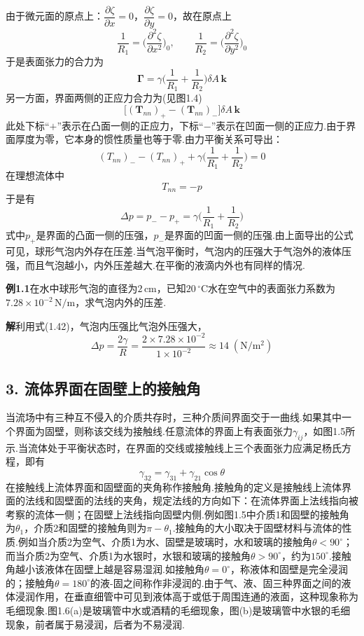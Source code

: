 由于微元面的原点上：$\dfrac{\partial\zeta}{\partial x}=0$，$\dfrac{\partial\zeta}{\partial y}=0$，故在原点上
\[
\frac{1}{R_1}=\Big(\frac{\partial^{2}\zeta}{\partial x^{2}}\Big)_{\!0},\qquad
\frac{1}{R_2}=\Big(\frac{\partial^{2}\zeta}{\partial y^{2}}\Big)_{\!0}
\]
于是表面张力的合力为
\begin{equation*}
\boldsymbol{\Gamma}=\gamma\Big(\frac{1}{R_1}+\frac{1}{R_2}\Big)\delta A\,\boldsymbol{k}
\tag{1.40}
\end{equation*}
另一方面，界面两侧的正应力合力为(见图1.4)
\[
\big[(\boldsymbol{T}_{nn})_{+}-(\boldsymbol{T}_{nn})_{-}\big]\delta A\,\boldsymbol{k}
\]
此处下标“$+$”表示在凸面一侧的正应力，下标“$-$”表示在凹面一侧的正应力.由于界面厚度为零，它本身的惯性质量也等于零.由力平衡关系可导出：
\begin{equation*}
(T_{nn})_{-}-(T_{nn})_{+}+\gamma\Big(\frac{1}{R_1}+\frac{1}{R_2}\Big)=0
\tag{1.41}
\end{equation*}
在理想流体中
\[
T_{nn}=-p
\]
于是有
\begin{equation*}
\Delta p=p_{-}-p_{+}=\gamma\Big(\frac{1}{R_1}+\frac{1}{R_2}\Big)
\tag{1.42}
\end{equation*}
式中$p_+$是界面的凸面一侧的压强，$p_-$是界面的凹面一侧的压强.由上面导出的公式可见，球形气泡内外存在压差.当气泡平衡时，气泡内的压强大于气泡外的液体压强，而且气泡越小，内外压差越大.在平衡的液滴内外也有同样的情况.

\noindent\textbf{例1.1}\quad 在水中球形气泡的直径为$2\,$cm，已知$20\,^\circ$C水在空气中的表面张力系数为$7.28\times 10^{-2}\,\mathrm{N/m}$，求气泡内外的压差.

\noindent\textbf{解}\quad 利用式(1.42)，气泡内压强比气泡外压强大，
\[
\Delta p=\frac{2\gamma}{R}=\frac{2\times 7.28\times 10^{-2}}{1\times 10^{-2}}\approx 14\;(\mathrm{N/m^{2}})
\]

\subsection*{3. 流体界面在固壁上的接触角}

当流场中有三种互不侵入的介质共存时，三种介质间界面交于一曲线.如果其中一个界面为固壁，则称该交线为接触线.任意流体的界面上有表面张力$\gamma_{ij}$，如图1.5所示.当流体处于平衡状态时，在界面的交线或接触线上三个表面张力应满足杨氏方程，即有
\begin{equation*}
\gamma_{32}=\gamma_{31}+\gamma_{21}\cos\theta
\tag{1.43}
\end{equation*}
在接触线上流体界面和固壁面的夹角称作接触角.接触角的定义是接触线上流体界面的法线和固壁面的法线的夹角，规定法线的方向如下：在流体界面上法线指向被考察的流体一侧；在固壁上法线指向固壁内侧.例如图1.5中介质1和固壁的接触角为$\theta_1$，介质2和固壁的接触角则为$\pi-\theta_1$.接触角的大小取决于固壁材料与流体的性质.例如当介质2为空气、介质1为水、固壁是玻璃时，水和玻璃的接触角$\theta<90^\circ$；而当介质2为空气、介质1为水银时，水银和玻璃的接触角$\theta>90^\circ$，约为$150^\circ$.接触角越小该液体在固壁上越是容易湿润.如接触角$\theta=0^\circ$，称液体和固壁是完全浸润的；接触角$\theta=180^\circ$的液-固之间称作非浸润的.由于气、液、固三种界面之间的液体浸润作用，在垂直细管中可见到液体高于或低于周围连通的液面，这种现象称为毛细现象.图1.6(a)是玻璃管中水或酒精的毛细现象，图(b)是玻璃管中水银的毛细现象，前者属于易浸润，后者为不易浸润.

